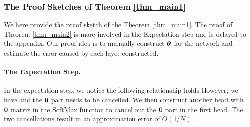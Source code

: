 \subsubsection{The Proof Sketches of Theorem \ref{thm_main1}}
We here provide the proof sketch of the Theorem \ref{thm_main1}. The proof of Theorem \ref{thm_main2} is more involved in the Expectation step and is delayed to the appendix. Our proof idea is to manually construct $\boldsymbol{\theta}$ for the network and estimate the error caused by each layer constructed. 

\paragraph{The Expectation Step.} In the expectation step, we notice the following relationship holds
However, we have  and the $\boldsymbol{0}$ part needs to be cancelled. We then construct another head with $\boldsymbol{0}$ matrix in the SoftMax function to cancel out the $\boldsymbol{0}$ part in the first head. The two cancellations result in an approximation error of $O(1/N)$. 

